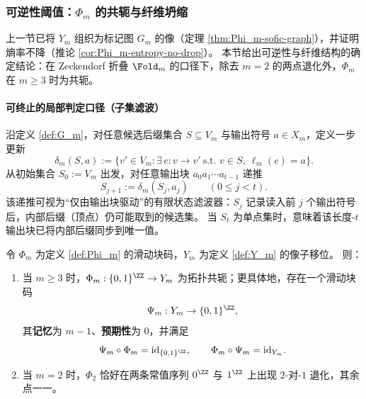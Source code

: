 \subsubsection{可逆性阈值：\texorpdfstring{$\Phi_m$}{Phi\_m} 的共轭与纤维坍缩}\label{subsec:Phi_m-conjugacy}

上一节已将 $Y_m$ 组织为标记图 $G_m$ 的像（定理 \ref{thm:Phi_m-sofic-graph}），并证明熵率不降（推论 \ref{cor:Phi_m-entropy-no-drop}）。
本节给出可逆性与纤维结构的确定结论：在 Zeckendorf 折叠 $\Fold_m$ 的口径下，除去 $m=2$ 的两点退化外，$\Phi_m$ 在 $m\ge 3$ 时为共轭。

\paragraph{可终止的局部判定口径（子集滤波）}
沿定义 \ref{def:G_m}，对任意候选后缀集合 $S\subseteq V_m$ 与输出符号 $a\in X_m$，定义一步更新
$$
\delta_m(S,a):=\{v'\in V_m:\exists\,e:v\to v'\ \text{s.t. }v\in S,\ \ell_m(e)=a\}.
$$
从初始集合 $S_0:=V_m$ 出发，对任意输出块 $a_0a_1\cdots a_{t-1}$ 递推
$$
S_{j+1}:=\delta_m(S_j,a_j)\qquad(0\le j<t).
$$
该递推可视为“仅由输出块驱动”的有限状态滤波器：$S_j$ 记录读入前 $j$ 个输出符号后，内部后缀（顶点）仍可能取到的候选集。
当 $S_t$ 为单点集时，意味着该长度-$t$ 输出块已将内部后缀同步到唯一值。

\begin{theorem}[可逆性阈值与有限窗逆码]\label{thm:Phi_m-conjugacy-threshold}
令 $\Phi_m$ 为定义 \ref{def:Phi_m} 的滑动块码，$Y_m$ 为定义 \ref{def:Y_m} 的像子移位。
则：
\begin{enumerate}
  \item 当 $m\ge 3$ 时，$\Phi_m:\{0,1\}^{\ZZ}\to Y_m$ 为拓扑共轭；更具体地，存在一个滑动块码
  $$
  \Psi_m:Y_m\to\{0,1\}^{\ZZ},
  $$
  其\textbf{记忆}为 $m-1$、\textbf{预期性}为 $0$，并满足
  $$
  \Psi_m\circ\Phi_m=\mathrm{id}_{\{0,1\}^{\ZZ}},\qquad
  \Phi_m\circ\Psi_m=\mathrm{id}_{Y_m}.
  $$
  \item 当 $m=2$ 时，$\Phi_2$ 恰好在两条常值序列 $0^{\ZZ}$ 与 $1^{\ZZ}$ 上出现 $2$-对-$1$ 退化，其余点一一。
\end{enumerate}
\end{theorem}

